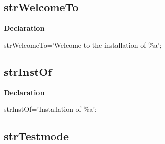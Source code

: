 \documentclass{report}
\newif\ifpdf
\begin{document}
\subsection*{strWelcomeTo}
\fi
\label{trstrings-strWelcomeTo}
\begin{list}{}{
\setlength{\itemindent}{0cm}
\setlength{\listparindent}{0cm}
\setlength{\leftmargin}{\evensidemargin}
\addtolength{\leftmargin}{\tmplength}
\settowidth{\labelsep}{X}
\addtolength{\leftmargin}{\labelsep}
\setlength{\labelwidth}{\tmplength}
}
\item[\textbf{Declaration}\hfill]
\ifpdf
\begin{flushleft}
\fi
\begin{ttfamily}
strWelcomeTo='Welcome to the installation of {\%}a';\end{ttfamily}

\ifpdf
\end{flushleft}
\fi

\end{list}
\ifpdf
\subsection*{\large{\textbf{strInstOf}}\normalsize\hspace{1ex}\hrulefill}
\else
\subsection*{strInstOf}
\fi
\label{trstrings-strInstOf}
\begin{list}{}{
\setlength{\itemindent}{0cm}
\setlength{\listparindent}{0cm}
\setlength{\leftmargin}{\evensidemargin}
\addtolength{\leftmargin}{\tmplength}
\settowidth{\labelsep}{X}
\addtolength{\leftmargin}{\labelsep}
\setlength{\labelwidth}{\tmplength}
}
\item[\textbf{Declaration}\hfill]
\ifpdf
\begin{flushleft}
\fi
\begin{ttfamily}
strInstOf='Installation of {\%}a';\end{ttfamily}

\ifpdf
\end{flushleft}
\fi

\end{list}
\ifpdf
\subsection*{\large{\textbf{strTestmode}}\normalsize\hspace{1ex}\hrulefill}
\else
\end{document}
